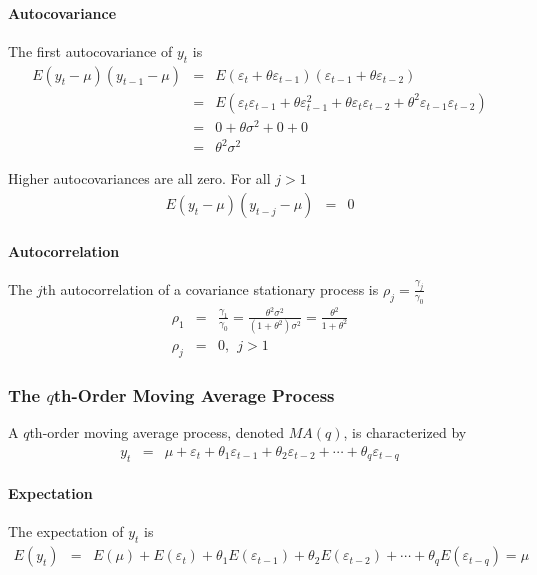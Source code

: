 \paragraph{Autocovariance}
The first autocovariance of $y_{t}$ is 
\begin{eqnarray*}
E(y_{t}-\mu)(y_{t-1}-\mu)&=&E(\varepsilon_{t}+\theta\varepsilon_{t-1})(\varepsilon_{t-1}+\theta\varepsilon_{t-2})\\
&=&E\left(\varepsilon_{t}\varepsilon_{t-1}+\theta\varepsilon_{t-1}^{2}+\theta\varepsilon_{t}\varepsilon_{t-2}+\theta^{2}\varepsilon_{t-1}\varepsilon_{t-2}\right)\\
&=&0+\theta\sigma^{2}+0+0\\
&=&\theta^{2}\sigma^{2}
\end{eqnarray*}

Higher autocovariances are all zero. For all $j>1$
\begin{eqnarray*}
E(y_{t}-\mu)(y_{t-j}-\mu)&=&0
\end{eqnarray*}

\paragraph{Autocorrelation}
The $j$th autocorrelation of a covariance stationary process is $\rho_{j}=\frac{\gamma_{j}}{\gamma_{0}}$
\begin{eqnarray*}
\rho_{1}&=&\frac{\gamma_{1}}{\gamma_{0}}=\frac{\theta^{2}\sigma^{2}}{(1+\theta^{2})\sigma^{2}}=\frac{\theta^{2}}{1+\theta^{2}}\\
\rho_{j}&=&0,\ \ \text{$j>1$}
\end{eqnarray*}


\subsubsection{The $q$th-Order Moving Average Process}
A $q$th-order moving average process, denoted $MA(q)$, is characterized by
\begin{eqnarray*}
y_{t}&=&\mu+\varepsilon_{t}+\theta_{1}\varepsilon_{t-1}+\theta_{2}\varepsilon_{t-2}+\cdots+\theta_{q}\varepsilon_{t-q}
\end{eqnarray*}

\paragraph{Expectation}
The expectation of $y_{t}$ is 
\begin{eqnarray*}
E(y_{t})&=&E(\mu)+E(\varepsilon_{t})+\theta_{1}E(\varepsilon_{t-1})+\theta_{2}E(\varepsilon_{t-2})+\cdots+\theta_{q}E(\varepsilon_{t-q})=\mu
\end{eqnarray*}

